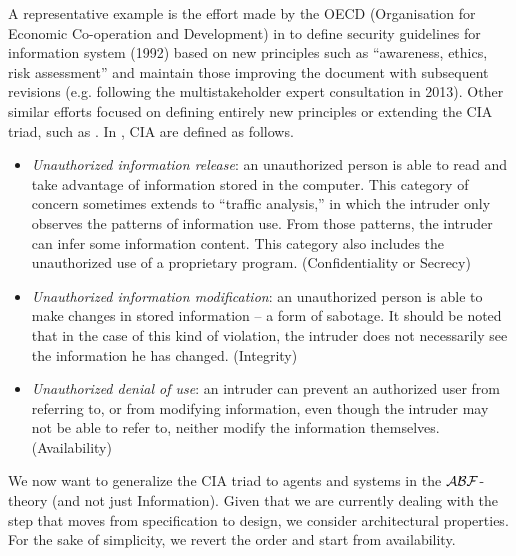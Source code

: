 A representative example is the effort made by the OECD (Organisation for Economic
Co-operation and Development) in \autocite{OECD2013guidelines} to define
security guidelines for information system (1992) based on new principles such
as ``awareness, ethics, risk assessment'' and maintain those improving the document with
subsequent revisions 
(e.g.  following the multistakeholder expert consultation in 2013).
Other similar efforts focused on defining entirely new principles or extending
the CIA triad, such as \autocite{NISTSP800-160}. 
In \autocite{Anderson1972report,Samonas2014cia}, CIA are defined as follows.
\begin{itemize}
	\item \emph{Unauthorized information release}: an unauthorized person is able
		to read and take  advantage  of  information  stored  in  the
		computer.  This  category of concern  sometimes  extends  to
		``traffic  analysis,''  in  which  the intruder  only observes
		the  patterns  of  information  use.  From  those patterns,
		the  intruder can   infer   some   information   content.
		This category   also   includes   the unauthorized use of a
		proprietary program.  (Confidentiality or Secrecy) 
	\item \emph{Unauthorized  information  modification}:  an  unauthorized person
		is  able  to make changes in stored information -- a form  of
		sabotage.  It should be noted that in the case of this kind of
		violation, the intruder does not necessarily see the
		information he has changed.  (Integrity)
	\item \emph{Unauthorized  denial  of  use}:  an  intruder  can  prevent  an
		authorized  user  from referring to, or from modifying
		information, even though the intruder may not be able to refer
		to, neither modify the information themselves. (Availability)
\end{itemize}

We now want to generalize the CIA triad to agents and systems in the
$\mathcal{A}\mathcal{B}\mathcal{F}$-theory (and not just Information). Given that we are currently
dealing with the step that moves from specification to design, we consider
architectural properties. For the sake of simplicity, we revert the order and
start from availability.

